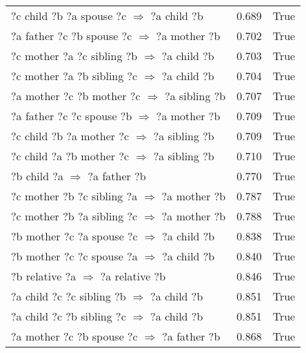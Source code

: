 \begin{longtable}{lrl}
        ?c  child  ?b  ?a  spouse  ?c   $\Rightarrow$ ?a  child  ?b &           0.689 &                     True \\
      ?a  father  ?c  ?b  spouse  ?c   $\Rightarrow$ ?a  mother  ?b &           0.702 &                     True \\
      ?c  mother  ?a  ?c  sibling  ?b   $\Rightarrow$ ?a  child  ?b &           0.703 &                     True \\
      ?c  mother  ?a  ?b  sibling  ?c   $\Rightarrow$ ?a  child  ?b &           0.704 &                     True \\
     ?a  mother  ?c  ?b  mother  ?c   $\Rightarrow$ ?a  sibling  ?b &           0.707 &                     True \\
      ?a  father  ?c  ?c  spouse  ?b   $\Rightarrow$ ?a  mother  ?b &           0.709 &                     True \\
      ?c  child  ?b  ?a  mother  ?c   $\Rightarrow$ ?a  sibling  ?b &           0.709 &                     True \\
      ?c  child  ?a  ?b  mother  ?c   $\Rightarrow$ ?a  sibling  ?b &           0.710 &                     True \\
                       ?b  child  ?a   $\Rightarrow$ ?a  father  ?b &           0.770 &                     True \\
     ?c  mother  ?b  ?c  sibling  ?a   $\Rightarrow$ ?a  mother  ?b &           0.787 &                     True \\
     ?c  mother  ?b  ?a  sibling  ?c   $\Rightarrow$ ?a  mother  ?b &           0.788 &                     True \\
       ?b  mother  ?c  ?a  spouse  ?c   $\Rightarrow$ ?a  child  ?b &           0.838 &                     True \\
       ?b  mother  ?c  ?c  spouse  ?a   $\Rightarrow$ ?a  child  ?b &           0.840 &                     True \\
                  ?b  relative  ?a   $\Rightarrow$ ?a  relative  ?b &           0.846 &                     True \\
       ?a  child  ?c  ?c  sibling  ?b   $\Rightarrow$ ?a  child  ?b &           0.851 &                     True \\
       ?a  child  ?c  ?b  sibling  ?c   $\Rightarrow$ ?a  child  ?b &           0.851 &                     True \\
      ?a  mother  ?c  ?b  spouse  ?c   $\Rightarrow$ ?a  father  ?b &           0.868 &                     True \\

\end{longtable}
